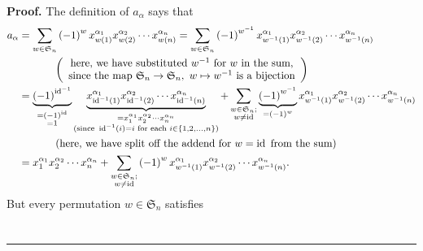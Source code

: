 \documentclass[numbers=enddot,12pt,final,onecolumn,notitlepage]{scrartcl}%
\theoremstyle{definition}
\newenvironment{proof}[1][Proof]{\noindent\textbf{#1.} }{\ \rule{0.5em}{0.5em}}
\let\sumnonlimits\sum
\renewcommand{\sum}{\sumnonlimits\limits}
\newenvironment{verlong}{}{}
\begin{document}
\begin{proof}
\begin{verlong}
The definition of $a_{\alpha}$ says that%
\begin{align}
a_{\alpha}  &  =\sum_{w\in\mathfrak{S}_{n}}\left(  -1\right)  ^{w}x_{w\left(
1\right)  }^{\alpha_{1}}x_{w\left(  2\right)  }^{\alpha_{2}}\cdots x_{w\left(
n\right)  }^{\alpha_{n}}=\sum_{w\in\mathfrak{S}_{n}}\left(  -1\right)
^{w^{-1}}x_{w^{-1}\left(  1\right)  }^{\alpha_{1}}x_{w^{-1}\left(  2\right)
}^{\alpha_{2}}\cdots x_{w^{-1}\left(  n\right)  }^{\alpha_{n}}\nonumber\\
&  \ \ \ \ \ \ \ \ \ \ \left(
\begin{array}
[c]{c}%
\text{here, we have substituted }w^{-1}\text{ for }w\text{ in the sum,}\\
\text{since the map }\mathfrak{S}_{n}\rightarrow\mathfrak{S}_{n},\ w\mapsto
w^{-1}\text{ is a bijection}%
\end{array}
\right) \nonumber\\
&  =\underbrace{\left(  -1\right)  ^{\operatorname*{id}\nolimits^{-1}}%
}_{\substack{=\left(  -1\right)  ^{\operatorname*{id}}\\=1}%
}\underbrace{x_{\operatorname*{id}\nolimits^{-1}\left(  1\right)  }%
^{\alpha_{1}}x_{\operatorname*{id}\nolimits^{-1}\left(  2\right)  }%
^{\alpha_{2}}\cdots x_{\operatorname*{id}\nolimits^{-1}\left(  n\right)
}^{\alpha_{n}}}_{\substack{=x_{1}^{\alpha_{1}}x_{2}^{\alpha_{2}}\cdots
x_{n}^{\alpha_{n}}\\\text{(since }\operatorname*{id}\nolimits^{-1}\left(
i\right)  =i\text{ for each }i\in\left\{  1,2,\ldots,n\right\}  \text{)}%
}}+\sum_{\substack{w\in\mathfrak{S}_{n};\\w\neq\operatorname*{id}%
}}\underbrace{\left(  -1\right)  ^{w^{-1}}}_{=\left(  -1\right)  ^{w}%
}x_{w^{-1}\left(  1\right)  }^{\alpha_{1}}x_{w^{-1}\left(  2\right)  }%
^{\alpha_{2}}\cdots x_{w^{-1}\left(  n\right)  }^{\alpha_{n}}\nonumber\\
&  \ \ \ \ \ \ \ \ \ \ \left(  \text{here, we have split off the addend for
}w=\operatorname*{id}\text{ from the sum}\right) \nonumber\\
&  =x_{1}^{\alpha_{1}}x_{2}^{\alpha_{2}}\cdots x_{n}^{\alpha_{n}}%
+\sum_{\substack{w\in\mathfrak{S}_{n};\\w\neq\operatorname*{id}}}\left(
-1\right)  ^{w}x_{w^{-1}\left(  1\right)  }^{\alpha_{1}}x_{w^{-1}\left(
2\right)  }^{\alpha_{2}}\cdots x_{w^{-1}\left(  n\right)  }^{\alpha_{n}}.
\label{pf.lem.alt.linind.coeff-kron.pf.1}%
\end{align}
But every permutation $w\in\mathfrak{S}_{n}$ satisfies%
\begin{align}

\end{align}
\end{verlong}
\end{proof}
\end{document}

